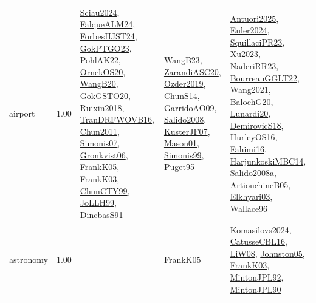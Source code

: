 {\begin{longtable}{p{3cm}r>{\raggedright\arraybackslash}p{6cm}>{\raggedright\arraybackslash}p{6cm}>{\raggedright\arraybackslash}p{8cm}}
\index{airport}\index{ApplicationAreas!airport}airport &  1.00 & \hyperref[detail:Sciau2024]{Sciau2024}, \hyperref[detail:FalqueALM24]{FalqueALM24}, \hyperref[detail:ForbesHJST24]{ForbesHJST24}, \hyperref[detail:GokPTGO23]{GokPTGO23}, \hyperref[detail:PohlAK22]{PohlAK22}, \hyperref[detail:OrnekOS20]{OrnekOS20}, \hyperref[detail:WangB20]{WangB20}, \hyperref[detail:GokGSTO20]{GokGSTO20}, \hyperref[detail:Ruixin2018]{Ruixin2018}, \hyperref[detail:TranDRFWOVB16]{TranDRFWOVB16}, \hyperref[detail:Chun2011]{Chun2011}, \hyperref[detail:Simonis07]{Simonis07}, \hyperref[detail:Gronkvist06]{Gronkvist06}, \hyperref[detail:FrankK05]{FrankK05}, \hyperref[detail:FrankK03]{FrankK03}, \hyperref[detail:ChunCTY99]{ChunCTY99}, \hyperref[detail:JoLLH99]{JoLLH99}, \hyperref[detail:DincbasS91]{DincbasS91} & \hyperref[detail:WangB23]{WangB23}, \hyperref[detail:ZarandiASC20]{ZarandiASC20}, \hyperref[detail:Ozder2019]{Ozder2019}, \hyperref[detail:ChunS14]{ChunS14}, \hyperref[detail:GarridoAO09]{GarridoAO09}, \hyperref[detail:Salido2008]{Salido2008}, \hyperref[detail:KusterJF07]{KusterJF07}, \hyperref[detail:Mason01]{Mason01}, \hyperref[detail:Simonis99]{Simonis99}, \hyperref[detail:Puget95]{Puget95} & \hyperref[detail:Antuori2025]{Antuori2025}, \hyperref[detail:Euler2024]{Euler2024}, \hyperref[detail:SquillaciPR23]{SquillaciPR23}, \hyperref[detail:Xu2023]{Xu2023}, \hyperref[detail:NaderiRR23]{NaderiRR23}, \hyperref[detail:BourreauGGLT22]{BourreauGGLT22}, \hyperref[detail:Wang2021]{Wang2021}, \hyperref[detail:BalochG20]{BalochG20}, \hyperref[detail:Lunardi20]{Lunardi20}, \hyperref[detail:DemirovicS18]{DemirovicS18}, \hyperref[detail:HurleyOS16]{HurleyOS16}, \hyperref[detail:Fahimi16]{Fahimi16}, \hyperref[detail:HarjunkoskiMBC14]{HarjunkoskiMBC14}, \hyperref[detail:Salido2008a]{Salido2008a}, \hyperref[detail:ArtiouchineB05]{ArtiouchineB05}, \hyperref[detail:Elkhyari03]{Elkhyari03}, \hyperref[detail:Wallace96]{Wallace96}\\
\index{astronomy}\index{ApplicationAreas!astronomy}astronomy &  1.00 &  & \hyperref[detail:FrankK05]{FrankK05} & \hyperref[detail:Komasilovs2024]{Komasilovs2024}, \hyperref[detail:CatusseCBL16]{CatusseCBL16}, \hyperref[detail:LiW08]{LiW08}, \hyperref[detail:Johnston05]{Johnston05}, \hyperref[detail:FrankK03]{FrankK03}, \hyperref[detail:MintonJPL92]{MintonJPL92}, \hyperref[detail:MintonJPL90]{MintonJPL90}\\

\end{longtable}}
